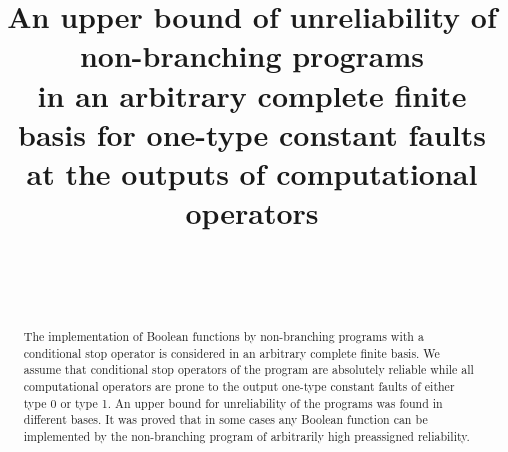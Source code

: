 \documentclass[
11pt,%
tightenlines,%
twoside,%
onecolumn,%
nofloats,%
nobibnotes,%
nofootinbib,%
superscriptaddress,%
noshowpacs,%
centertags]%
{revtex4}
\begin{document}

\title{An upper bound of unreliability of non-branching programs \\
in an arbitrary complete finite basis
for one-type constant faults \\ at the outputs of computational operators}

\author{~}

\author{~}




\begin{abstract} %
The implementation of Boolean functions by non-branching programs with a conditional stop operator is considered in an arbitrary complete finite basis. We assume that conditional stop operators of the program are absolutely reliable while  all computational operators are prone to the output one-type constant faults of either type 0 or type 1. An upper bound for unreliability of the programs was found  in different bases. It was proved that in some cases  any Boolean function can be implemented by the non-branching program of arbitrarily high preassigned reliability.
\end{abstract}


\end{document}
